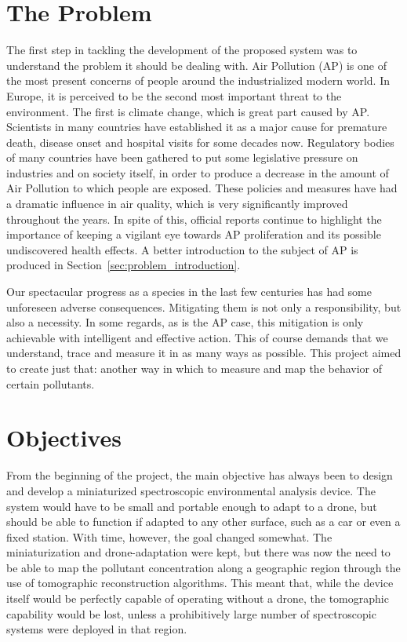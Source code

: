 \section{The Problem}%
\label{sec:the_problem}

The first step in tackling the development of the proposed system was to
understand the problem it should be dealing with. Air Pollution
(\gls{AP}) is one of the most present concerns of people around the
industrialized modern world. In Europe, it is perceived to be the second
most important threat to the environment. The first is climate change,
which is great part caused by \gls{AP}. Scientists in many countries
have established it as a major cause for premature death, disease onset
and hospital visits for some decades now. Regulatory bodies of many
countries have been gathered to put some legislative pressure on
industries and on society itself, in order to produce a decrease in the
amount of Air Pollution to which people are exposed. These policies and
measures have had a dramatic influence in air quality, which is very
significantly improved throughout the years. In spite of this, official
reports continue to highlight the importance of keeping a vigilant eye
towards \gls{AP} proliferation and its possible undiscovered health
effects. A better introduction to the subject of \gls{AP} is produced in
Section~\ref{sec:problem_introduction}.

Our spectacular progress as a species in the last few centuries has had
some unforeseen adverse consequences. Mitigating them is not only a
responsibility, but also a necessity. In some regards, as is the
\gls{AP} case, this mitigation is only achievable with intelligent and
effective action. This of course demands that we understand, trace and
measure it in as many ways as possible. This project aimed to create
just that: another way in which to measure and map the behavior of
certain pollutants.

\section{Objectives}%
\label{sec:objectives}

From the beginning of the project, the main objective has always been to
design and develop a miniaturized spectroscopic environmental analysis
device. The system would have to be small and portable enough to adapt
to a drone, but should be able to function if adapted to any other
surface, such as a car or even a fixed station. With time, however, the
goal changed somewhat. The miniaturization and drone-adaptation were
kept, but there was now the need to be able to map the pollutant
concentration along a geographic region through the use of tomographic
reconstruction algorithms. This meant that, while the device itself
would be perfectly capable of operating without a drone, the tomographic
capability would be lost, unless a prohibitively large number of
spectroscopic systems were deployed in that region.

